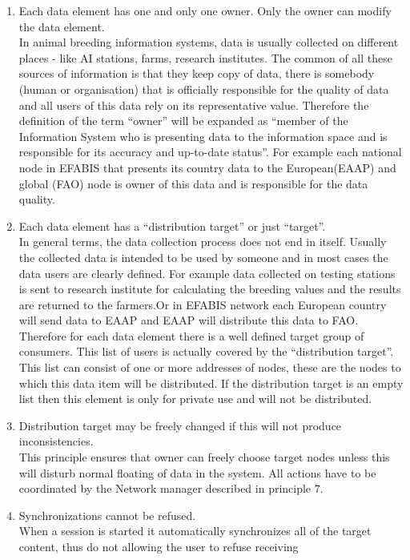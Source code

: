 \begin{enumerate}
\item Each data element has one and only one owner. Only the owner can modify
the data element.\\
In animal breeding information systems, data is usually collected
on different places - like AI stations, farms, research institutes.
The common of all these sources of information is that they keep copy
of data, there is somebody (human or organisation) that is officially
responsible for the quality of data and all users of this data rely
on its representative value. Therefore the definition of the term
{}``owner'' will be expanded as {}``member of the Information System
who is presenting data to the information space and is responsible
for its accuracy and up-to-date status''. For example each national
node in EFABIS that presents its country data to the European(EAAP)
and global (FAO) node is owner of this data and is responsible for
the data quality.
\item Each data element has a {}``distribution target'' or just {}``target''.\\
In general terms, the data collection process does not end in itself.
Usually the collected data is intended to be used by someone and in
most cases the data users are clearly defined. For example data collected
on testing stations is sent to research institute for calculating
the breeding values and the results are returned to the farmers.Or
in EFABIS network each European country will send data to EAAP and
EAAP will distribute this data to FAO. Therefore for each data element
there is a well defined target group of consumers. This list of users
is actually covered by the {}``distribution target''. This list
can consist of one or more addresses of nodes, these are the nodes
to which this data item will be distributed. If the distribution target
is an empty list then this element is only for private use and will
not be distributed.
\item Distribution target may be freely changed if this will not produce
inconsistencies.\\
This principle ensures that owner can freely choose target nodes unless
this will disturb normal floating of data in the system. All actions
have to be coordinated by the Network manager described in principle
7.
\item Synchronizations cannot be refused.\\
When a session is started it automatically synchronizes all of the
target content, thus do not allowing the user to refuse receiving

\end{enumerate}
